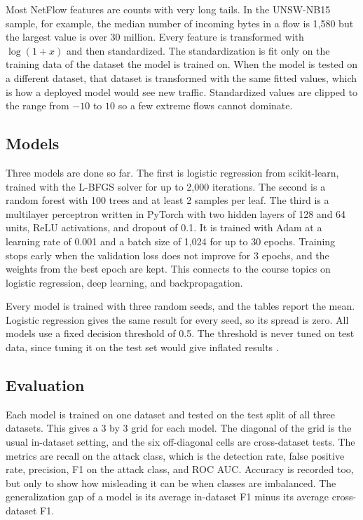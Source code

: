 \documentclass[10pt,twocolumn,letterpaper]{article}
\begin{document}
Most NetFlow features are counts with very long tails. In the UNSW-NB15 sample, for example, the median number of incoming bytes in a flow is 1,580 but the largest value is over 30 million. Every feature is transformed with \mbox{$\log(1+x)$} and then standardized. The standardization is fit only on the training data of the dataset the model is trained on. When the model is tested on a different dataset, that dataset is transformed with the same fitted values, which is how a deployed model would see new traffic. Standardized values are clipped to the range from $-10$ to $10$ so a few extreme flows cannot dominate.

\subsection{Models}

Three models are done so far. The first is logistic regression from scikit-learn, trained with the L-BFGS solver for up to 2,000 iterations. The second is a random forest with 100 trees and at least 2 samples per leaf. The third is a multilayer perceptron written in PyTorch with two hidden layers of 128 and 64 units, ReLU activations, and dropout of 0.1. It is trained with Adam at a learning rate of 0.001 and a batch size of 1,024 for up to 30 epochs. Training stops early when the validation loss does not improve for 3 epochs, and the weights from the best epoch are kept. This connects to the course topics on logistic regression, deep learning, and backpropagation.

Every model is trained with three random seeds, and the tables report the mean. Logistic regression gives the same result for every seed, so its spread is zero. All models use a fixed decision threshold of 0.5. The threshold is never tuned on test data, since tuning it on the test set would give inflated results \cite{arp2022}.

\subsection{Evaluation}

Each model is trained on one dataset and tested on the test split of all three datasets. This gives a 3 by 3 grid for each model. The diagonal of the grid is the usual in-dataset setting, and the six off-diagonal cells are cross-dataset tests. The metrics are recall on the attack class, which is the detection rate, false positive rate, precision, F1 on the attack class, and ROC AUC. Accuracy is recorded too, but only to show how misleading it can be when classes are imbalanced. The generalization gap of a model is its average in-dataset F1 minus its average cross-dataset F1.
\end{document}
